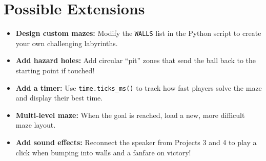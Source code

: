 \section{Possible Extensions}
\begin{itemize}
    \item \textbf{Design custom mazes:} Modify the \texttt{WALLS} list in the Python script to create your own challenging labyrinths.
    \item \textbf{Add hazard holes:} Add circular ``pit'' zones that send the ball back to the starting point if touched!
    \item \textbf{Add a timer:} Use \texttt{time.ticks\_ms()} to track how fast players solve the maze and display their best time.
    \item \textbf{Multi-level maze:} When the goal is reached, load a new, more difficult maze layout.
    \item \textbf{Add sound effects:} Reconnect the speaker from Projects 3 and 4 to play a click when bumping into walls and a fanfare on victory!
\end{itemize}
